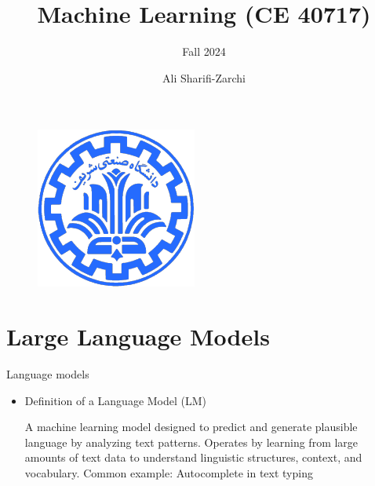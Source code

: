 \documentclass[serif, aspectratio=169]{beamer}
\author{Ali Sharifi-Zarchi}
\title{Machine Learning (CE 40717)}
\subtitle{Fall 2024}
\institute{
    CE Department \\
    Sharif University of Technology
}
\begin{document}
\begin{frame}
    \titlepage
    \vspace*{-0.6cm}
    \begin{figure}[htpb]
        \begin{center}
            \includegraphics[keepaspectratio, scale=0.25]{pic/sharif-main-logo.png}
        \end{center}
    \end{figure}
\end{frame}

\begin{frame}    
\tableofcontents[sectionstyle=show,
subsectionstyle=show/shaded/hide,
subsubsectionstyle=show/shaded/hide]
\end{frame}

\section{Large Language Models}

\begin{frame}{Language models}
    \begin{itemize}
        \item 
            \large{Definition of a Language Model (LM)}
         \vspace{0.5cm}
        \begin{outline}
            \1 A machine learning model designed to predict and generate plausible language by analyzing text patterns.
            \vspace{0.2cm}
            \1 Operates by learning from large amounts of text data to understand linguistic structures, context, and vocabulary.
            \2 Common example: Autocomplete in text typing
        \end{outline}
    \end{itemize}
     
\end{frame}
\end{document}
